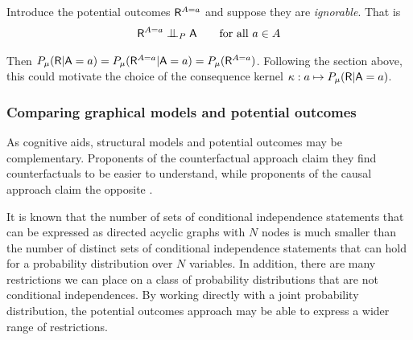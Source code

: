 Introduce the potential outcomes $\mathsf{R}^{A=a}$ and suppose they are \emph{ignorable}\cite{rubin_causal_2005}. That is
\begin{align}
    \RV{R}^{A=a}\CI_P \RV{A}\qquad\text{for all }a\in A 
\end{align}

Then $P_\mu(\mathsf{R}|\mathsf{A}=a) = P_\mu(\mathsf{R}^{A=a}|\mathsf{A}=a) = P_\mu(\mathsf{R}^{A=a})$. Following the section above, this could motivate the choice of the consequence kernel $\kappa:a\mapsto P_\mu(\mathsf{R}|\mathsf{A}=a)$. 

\subsubsection{Comparing graphical models and potential outcomes}

As cognitive aids, structural models and potential outcomes may be complementary. Proponents of the counterfactual approach claim they find counterfactuals to be easier to understand\cite{rubin_authors_2008,hernan_causal_2018}, while proponents of the causal approach claim the opposite \cite{pearl_causality:_2009}.

It is known that the number of sets of conditional independence statements that can be expressed as directed acyclic graphs with $N$ nodes is much smaller than the number of distinct sets of conditional independence statements that can hold for a probability distribution over $N$ variables\cite{matus_conditional_1995}. In addition, there are many restrictions we can place on a class of probability distributions that are not conditional independences. By working directly with a joint probability distribution, the potential outcomes approach may be able to express a wider range of restrictions.